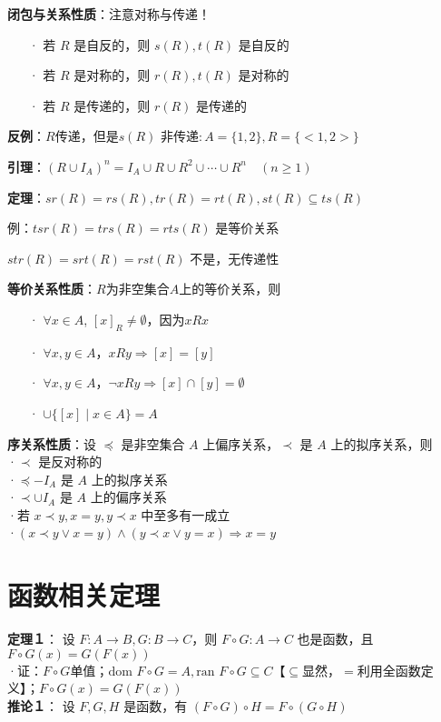	\textbf{闭包与关系性质}：注意对称与传递！
	\begin{itemize}
		\item[·] 若 $R$ 是自反的，则 $s(R), t(R)$ 是自反的
		\item[·] 若 $R$ 是对称的，则 $r(R), t(R)$ 是对称的
		\item[·] 若 $R$ 是传递的，则 $r(R)$ 是传递的
	\end{itemize}
	
	\textbf{反例}：$R\text{传递，但是} s(R) \text{ 非传递}: A=\{1,2\}, R=\{<1,2>\}$
	
	\textbf{引理}：$(R \cup I_A)^n = I_A \cup R \cup R^2 \cup \cdots \cup R^n \quad (n \geq 1)$
	
	\textbf{定理}：$sr(R) = rs(R), tr(R) = rt(R), st(R) \subseteq ts(R)$
	
	例：$tsr(R) = trs(R) = rts(R)$ 是等价关系
	
	$str(R) = srt(R) = rst(R)$ 不是，无传递性
	
	\textbf{等价关系性质}：$R \text{为非空集合} A \text{上的等价关系，则}$
	\begin{itemize}
		\item[·] $\forall x \in A$, $[x]_R \neq \emptyset$，因为$xRx$
		\item[·] $\forall x, y \in A$，$xRy \Rightarrow [x] = [y]$
		\item[·] $\forall x, y \in A$，$\lnot xRy \Rightarrow [x] \cap [y] = \emptyset$
		\item[·] $\cup \{[x] \mid x \in A\} = A$
	\end{itemize}
	
	\textbf{序关系性质}：设 $\preccurlyeq$ 是非空集合 $A$ 上偏序关系，$\prec$ 是 $A$ 上的拟序关系，则\\
	·$\prec$ 是反对称的\\
	·$\preccurlyeq-I_A$ 是 $A$ 上的拟序关系\\
	·$\prec\cup I_A$ 是 $A$ 上的偏序关系\\
	·若 $x \prec y, x = y, y \prec x$ 中至多有一成立\\
	·$(x \prec y \vee x = y) \wedge (y \prec x \vee y = x) \Rightarrow x = y$
	
	\section*{函数相关定理}
	
	\textbf{定理１}：
	设 $F:A \rightarrow B, G:B \rightarrow C$，则 $F \circ G:A \rightarrow C$ 也是函数，且 $F \circ G(x) = G(F(x))$\\
	·证：$F \circ G$单值；$\text{dom }F \circ G = A,  \text{ran } F\circ G \subseteq C$【$\subseteq$显然，$=$利用全函数定义】；$F \circ G(x) = G(F(x))$\\
	\textbf{推论１}：
	设 $F, G, H$ 是函数，有 $(F \circ G) \circ H = F \circ (G \circ H)$
	

